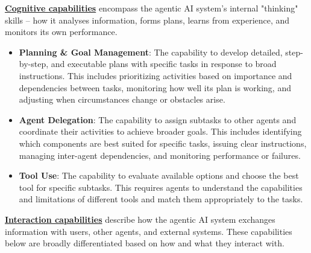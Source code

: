 \documentclass{article}
\begin{document}
\ul{\textbf{Cognitive capabilities}} encompass the agentic AI system's internal "thinking" skills – how it analyses information, forms plans, learns from experience, and monitors its own performance.

\begin{itemize}
    
    \item \textbf{Planning \& Goal Management}: The capability to develop detailed, step-by-step, and executable plans with specific tasks in response to broad instructions. This includes prioritizing activities based on importance and dependencies between tasks, monitoring how well its plan is working, and adjusting when circumstances change or obstacles arise.
    
    \item \textbf{Agent Delegation}: The capability to assign subtasks to other agents and coordinate their activities to achieve broader goals. This includes identifying which components are best suited for specific tasks, issuing clear instructions, managing inter-agent dependencies, and monitoring performance or failures.
    
    \item \textbf{Tool Use}: The capability to evaluate available options and choose the best tool for specific subtasks. This requires agents to understand the capabilities and limitations of different tools and match them appropriately to the tasks.
    
\end{itemize}

\ul{\textbf{Interaction capabilities}} describe how the agentic AI system exchanges information with users, other agents, and external systems. These capabilities below are broadly differentiated based on how and what they interact with.
\end{document}
